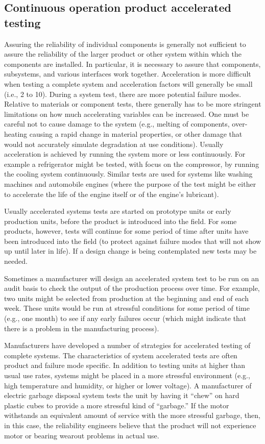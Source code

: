 \subsection{Continuous operation product accelerated testing}
Assuring the reliability of individual components is generally not
sufficient to assure the reliability of the larger product or other
system within which the components are installed. In particular, it
is necessary to assure that components, subsystems, and various
interfaces work together.  Acceleration is more difficult when
testing a complete system and acceleration factors will generally be
small (i.e., 2 to 10).  During a system test, there are more
potential failure modes.  Relative to materials or component tests,
there generally has to be more stringent limitations on how much
accelerating variables can be increased.  One must be careful not to
cause damage to the system (e.g., melting of components,
over-heating causing a rapid change in material properties, or other
damage that would not accurately simulate degradation at use
conditions).  Usually acceleration is achieved by running the system
more or less continuously. For example a refrigerator might be
tested, with focus on the compressor, by running the cooling system
continuously.  Similar tests are used for systems like washing
machines and automobile engines (where the purpose of the test might
be either to accelerate the life of the engine itself or of the
engine's lubricant).


Usually accelerated systems tests are started on prototype units or
early production units, before the product is introduced into the
field. For some products, however, tests will continue for some
period of time after units have been introduced into the field (to
protect against failure modes that will not show up until later in
life).  If a design change is being contemplated new tests may
be needed.

Sometimes a manufacturer will design an accelerated system test to
be run on an audit basis to check the output of the production
process over time. For example, two units might be selected from
production at the beginning and end of each week.  These units would
be run at stressful conditions for some period of time (e.g., one
month) to see if any early failures occur (which might indicate that
there is a problem in the manufacturing process).

Manufacturers have developed a number of strategies for accelerated
testing of complete systems.  The characteristics of system
accelerated tests are often product and failure mode specific.  In
addition to testing units at higher than usual use rates, systems
might be placed in a more stressful environment (e.g., high
temperature and humidity, or higher or lower voltage).  A
manufacturer of electric garbage disposal system tests the unit by
having it ``chew'' on hard plastic cubes to provide a more stressful
kind of ``garbage.''  If the motor withstands an equivalent amount
of service with the more stressful garbage, then, in this case, the
reliability engineers believe that the product will not experience
motor or bearing wearout problems in actual use.

